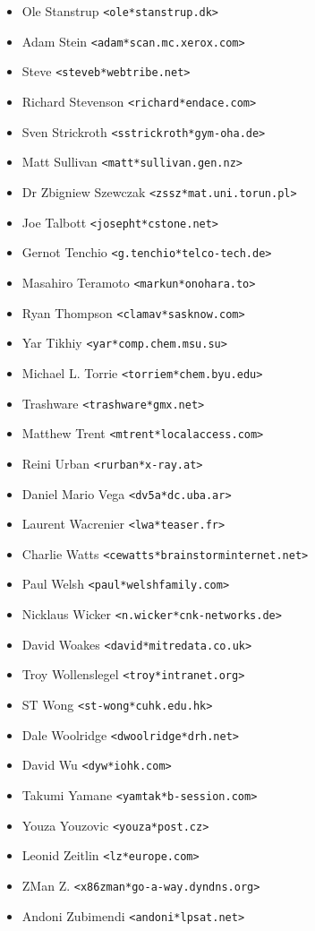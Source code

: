 \documentclass[a4paper,titlepage,12pt]{article}
\newcommand{\email}[1]{\texttt{#1}}
\begin{document}
\begin{itemize}
	\item Ole Stanstrup \email{<ole*stanstrup.dk>}
	\item Adam Stein \email{<adam*scan.mc.xerox.com>}
	\item Steve \email{<steveb*webtribe.net>}
	\item Richard Stevenson \email{<richard*endace.com>}
	\item Sven Strickroth \email{<sstrickroth*gym-oha.de>}
	\item Matt Sullivan \email{<matt*sullivan.gen.nz>}
	\item Dr Zbigniew Szewczak \email{<zssz*mat.uni.torun.pl>}
	\item Joe Talbott \email{<josepht*cstone.net>}
	\item Gernot Tenchio \email{<g.tenchio*telco-tech.de>}
	\item Masahiro Teramoto \email{<markun*onohara.to>}
	\item Ryan Thompson \email{<clamav*sasknow.com>}
	\item Yar Tikhiy \email{<yar*comp.chem.msu.su>}
	\item Michael L. Torrie \email{<torriem*chem.byu.edu>}
	\item Trashware \email{<trashware*gmx.net>}
	\item Matthew Trent \email{<mtrent*localaccess.com>}
	\item Reini Urban \email{<rurban*x-ray.at>}
	\item Daniel Mario Vega \email{<dv5a*dc.uba.ar>}
	\item Laurent Wacrenier \email{<lwa*teaser.fr>}
	\item Charlie Watts \email{<cewatts*brainstorminternet.net>}
	\item Paul Welsh \email{<paul*welshfamily.com>}
	\item Nicklaus Wicker \email{<n.wicker*cnk-networks.de>}
	\item David Woakes \email{<david*mitredata.co.uk>}
	\item Troy Wollenslegel \email{<troy*intranet.org>}
	\item ST Wong \email{<st-wong*cuhk.edu.hk>}
	\item Dale Woolridge \email{<dwoolridge*drh.net>}
	\item David Wu \email{<dyw*iohk.com>}
	\item Takumi Yamane \email{<yamtak*b-session.com>}
	\item Youza Youzovic \email{<youza*post.cz>}
	\item Leonid Zeitlin \email{<lz*europe.com>}
	\item ZMan Z. \email{<x86zman*go-a-way.dyndns.org>}
	\item Andoni Zubimendi \email{<andoni*lpsat.net>}
    \end{itemize}
\end{document}
